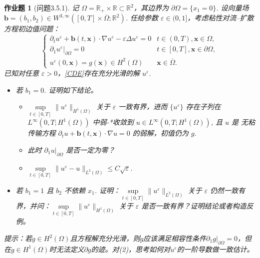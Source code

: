 \documentclass[UTF8,fontset=windows,12pt]{ctexart}
\theoremstyle{kaiti-theorem}
\newtheorem{problem}{作业题}
\numberwithin{equation}{section}
\newcommand{\R}{\mathbb{R}}
\newcommand{\bds}[1]{\boldsymbol{#1}}  %
\newcommand{\Om}{\Omega}
\newcommand{\Omb}{{\overline{\Omega}}}
\newcommand{\p}{\partial}
\newcommand{\eps}{\varepsilon}
\newcommand{\xx}{{\bds{x}}}
\begin{document}
\begin{problem}[问题3.5.1]
记 $\Om = \R_+\times\R\subset\R^2$，其边界为 $\p\Om = \{ x_1 = 0 \}$. 设向量场 $\mathbf{b}=(b_1,b_2) \in W^{3,\infty}([0,T]\times\Omb;\R^2)$. 任给参数 $\eps \in(0,1]$，考虑粘性对流--扩散方程初边值问题：
\begin{equation}\label{CDE}\tag{$P_\eps$}
\begin{cases}
\partial_t u^\eps + \mathbf{b}(t,\boldsymbol{x}) \cdot \nabla u^\eps - \eps \Delta u^\eps = 0&t\in(0,T),\xx\in\Om, \\
\p_1 u^\eps|_{\p\Om}=0& t\in[0,T],\xx\in\p\Om,\\
u^\eps(0,\boldsymbol{x}) = g(\boldsymbol{x}) \in H^2(\Om)&\xx\in\Omb.
\end{cases}
\end{equation}
已知对任意 $\eps > 0$，\eqref{CDE}存在充分光滑的解 $u^\eps$. 
\begin{itemize}
\item [(1)] 若 $b_1=0$. 证明如下结论。
	\begin{itemize}
	\item [(1a)] $\sup\limits_{t\in[0,T]}\|u^\eps\|_{H^1(\Om)}$ 关于 $\eps$ 一致有界，进而 $\{u^\eps\}$ 存在子列在 $L^\infty(0,T;H^1(\Om))$ 中弱-*收敛到 $u\in L^\infty(0,T;H^1(\Om))$, 且 $u$ 是 无粘传输方程 $\partial_t u + \mathbf{b}(t,\boldsymbol{x}) \cdot \nabla u =0$ 的弱解，初值仍为 $g$. 
	\item [(1b)] 此时 $\p_1 u|_{\p\Om}$ 是否一定为零？
	\item [(1c)] $\sup\limits_{t\in[0,T]}\|u^\eps-u\|_{L^2(\Om)}\leqslant C\sqrt{\eps}$. 
	\end{itemize}
\item [(2)] 若 $b_1=1$ 且 $b_2$ 不依赖 $x_1$. 证明：$\sup\limits_{t\in[0,T]}\|u^\eps\|_{L^2(\Om)}$ 关于 $\eps$ 仍然一致有界，并问：$\sup\limits_{t\in[0,T]}\|u^\eps\|_{H^1(\Om)}$ 关于 $\eps$ 是否一致有界？证明结论或者构造反例。
\end{itemize}
提示：若$g\in H^2(\Om)$且方程解充分光滑，则$g$应该满足相容性条件$\p_1 g|_{\p\Om}=0$，但在$g\in H^1(\Om)$时无法定义$\p g$的迹。对(2)，思考如何对$u^\eps$的一阶导数做一致估计。
\end{problem}
\end{document}
